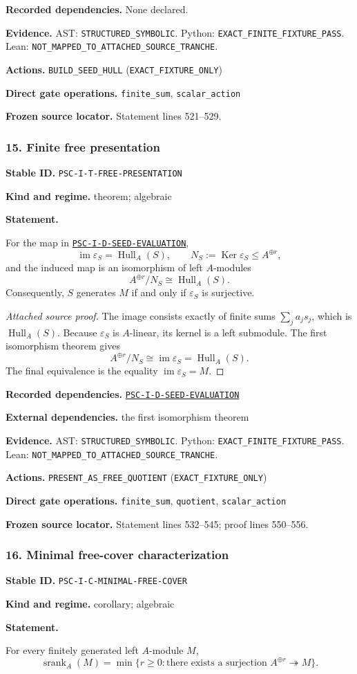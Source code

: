 \documentclass[a4paper,11pt]{article}
\newcommand{\Hull}{\operatorname{Hull}}\newcommand{\srank}{\operatorname{srank}}\newcommand{\psrank}{\operatorname{psrank}}\newcommand{\End}{\operatorname{End}}\newcommand{\Hom}{\operatorname{Hom}}\newcommand{\im}{\operatorname{im}}\newcommand{\Ker}{\operatorname{Ker}}\newcommand{\Jac}{\operatorname{Jac}}\newcommand{\Irr}{\operatorname{Irr}}\newcommand{\Span}{\operatorname{span}}\newcommand{\alg}{\operatorname{alg}}\newcommand{\Reach}{\operatorname{Reach}}\newcommand{\Supp}{\operatorname{Supp}}\newcommand{\id}{\mathrm{id}}\newcommand{\cl}[1]{\overline{#1}}
\newcommand{\field}[2]{\noindent\textbf{#1.} #2\par}
\begin{document}
\field{Recorded dependencies}{None declared.}
\field{Evidence}{AST: \nolinkurl{STRUCTURED_SYMBOLIC}. Python: \nolinkurl{EXACT_FINITE_FIXTURE_PASS}. Lean: \nolinkurl{NOT_MAPPED_TO_ATTACHED_SOURCE_TRANCHE}.}
\field{Actions}{\nolinkurl{BUILD_SEED_HULL} (\nolinkurl{EXACT_FIXTURE_ONLY})}
\field{Direct gate operations}{\nolinkurl{finite_sum}, \nolinkurl{scalar_action}}
\field{Frozen source locator}{Statement lines 521--529.}
\subsubsection*{15. Finite free presentation}
\label{rec:PSC-I-T-FREE-PRESENTATION}
\field{Stable ID}{\nolinkurl{PSC-I-T-FREE-PRESENTATION}}
\field{Kind and regime}{theorem; algebraic}
\textbf{Statement.}\par
For the map in \hyperref[rec:PSC-I-D-SEED-EVALUATION]{\nolinkurl{PSC-I-D-SEED-EVALUATION}},
\[
\im\varepsilon_S=\Hull_A(S),
\qquad
N_S:=\Ker\varepsilon_S\leq A^{\oplus r},
\]
and the induced map is an isomorphism of left $A$-modules
\[
\boxed{A^{\oplus r}/N_S\cong\Hull_A(S).}
\]
Consequently, $S$ generates $M$ if and only if $\varepsilon_S$ is surjective.

\begin{proof}[Attached source proof]
The image consists exactly of finite sums $\sum_ja_js_j$, which is $\Hull_A(S)$.  Because $\varepsilon_S$ is $A$-linear, its kernel is a left submodule.  The first isomorphism theorem gives
\[
A^{\oplus r}/N_S\cong\im\varepsilon_S=\Hull_A(S).
\]
The final equivalence is the equality $\im\varepsilon_S=M$.
\end{proof}
\field{Recorded dependencies}{\hyperref[rec:PSC-I-D-SEED-EVALUATION]{\nolinkurl{PSC-I-D-SEED-EVALUATION}}}
\field{External dependencies}{the first isomorphism theorem}
\field{Evidence}{AST: \nolinkurl{STRUCTURED_SYMBOLIC}. Python: \nolinkurl{EXACT_FINITE_FIXTURE_PASS}. Lean: \nolinkurl{NOT_MAPPED_TO_ATTACHED_SOURCE_TRANCHE}.}
\field{Actions}{\nolinkurl{PRESENT_AS_FREE_QUOTIENT} (\nolinkurl{EXACT_FIXTURE_ONLY})}
\field{Direct gate operations}{\nolinkurl{finite_sum}, \nolinkurl{quotient}, \nolinkurl{scalar_action}}
\field{Frozen source locator}{Statement lines 532--545; proof lines 550--556.}
\subsubsection*{16. Minimal free-cover characterization}
\label{rec:PSC-I-C-MINIMAL-FREE-COVER}
\field{Stable ID}{\nolinkurl{PSC-I-C-MINIMAL-FREE-COVER}}
\field{Kind and regime}{corollary; algebraic}
\textbf{Statement.}\par
For every finitely generated left $A$-module $M$,
\[
\boxed{
\srank_A(M)=\min\{r\geq0:\text{there exists a surjection }A^{\oplus r}\twoheadrightarrow M\}.
}
\]
\end{document}
